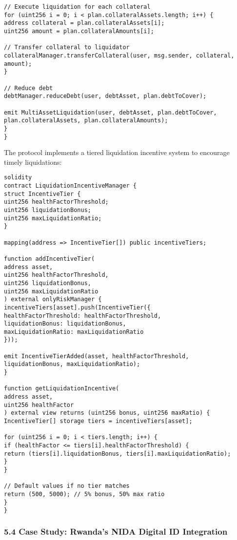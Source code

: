 \documentclass[12pt]{article}
\begin{document}
{{{\begin{lstlisting}
// Execute liquidation for each collateral
for (uint256 i = 0; i < plan.collateralAssets.length; i++) {
address collateral = plan.collateralAssets[i];
uint256 amount = plan.collateralAmounts[i];

// Transfer collateral to liquidator
collateralManager.transferCollateral(user, msg.sender, collateral, amount);
}

// Reduce debt
debtManager.reduceDebt(user, debtAsset, plan.debtToCover);

emit MultiAssetLiquidation(user, debtAsset, plan.debtToCover, plan.collateralAssets, plan.collateralAmounts);
}
}
\end{lstlisting}


The protocol implements a tiered liquidation incentive system to encourage timely liquidations:


\begin{lstlisting}
solidity
contract LiquidationIncentiveManager {
struct IncentiveTier {
uint256 healthFactorThreshold;
uint256 liquidationBonus;
uint256 maxLiquidationRatio;
}

mapping(address => IncentiveTier[]) public incentiveTiers;

function addIncentiveTier(
address asset,
uint256 healthFactorThreshold,
uint256 liquidationBonus,
uint256 maxLiquidationRatio
) external onlyRiskManager {
incentiveTiers[asset].push(IncentiveTier({
healthFactorThreshold: healthFactorThreshold,
liquidationBonus: liquidationBonus,
maxLiquidationRatio: maxLiquidationRatio
}));

emit IncentiveTierAdded(asset, healthFactorThreshold, liquidationBonus, maxLiquidationRatio);
}

function getLiquidationIncentive(
address asset,
uint256 healthFactor
) external view returns (uint256 bonus, uint256 maxRatio) {
IncentiveTier[] storage tiers = incentiveTiers[asset];

for (uint256 i = 0; i < tiers.length; i++) {
if (healthFactor <= tiers[i].healthFactorThreshold) {
return (tiers[i].liquidationBonus, tiers[i].maxLiquidationRatio);
}
}

// Default values if no tier matches
return (500, 5000); // 5% bonus, 50% max ratio
}
}
\end{lstlisting}

\subsubsection{5.4 Case Study: Rwanda's NIDA Digital ID Integration} %

}}}
\end{document}
